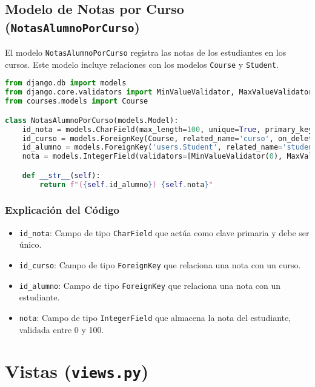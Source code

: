 \subsection{Modelo de Notas por Curso (\texttt{NotasAlumnoPorCurso})}

El modelo \texttt{NotasAlumnoPorCurso} registra las notas de los estudiantes en los cursos. Este modelo incluye relaciones con los modelos \texttt{Course} y \texttt{Student}.

\begin{lstlisting}[language=Python, caption=Modelo de Notas por Curso]
from django.db import models
from django.core.validators import MinValueValidator, MaxValueValidator
from courses.models import Course

class NotasAlumnoPorCurso(models.Model):
    id_nota = models.CharField(max_length=100, unique=True, primary_key=True)
    id_curso = models.ForeignKey(Course, related_name='curso', on_delete=models.CASCADE)
    id_alumno = models.ForeignKey('users.Student', related_name='student', on_delete=models.CASCADE)
    nota = models.IntegerField(validators=[MinValueValidator(0), MaxValueValidator(100)])

    def __str__(self):
        return f"({self.id_alumno}) {self.nota}"
\end{lstlisting}

\subsubsection{Explicación del Código}

\begin{itemize}
    \item \texttt{id_nota}: Campo de tipo \texttt{CharField} que actúa como clave primaria y debe ser único.
    \item \texttt{id_curso}: Campo de tipo \texttt{ForeignKey} que relaciona una nota con un curso.
    \item \texttt{id_alumno}: Campo de tipo \texttt{ForeignKey} que relaciona una nota con un estudiante.
    \item \texttt{nota}: Campo de tipo \texttt{IntegerField} que almacena la nota del estudiante, validada entre 0 y 100.
\end{itemize}

\section{Vistas (\texttt{views.py})}

